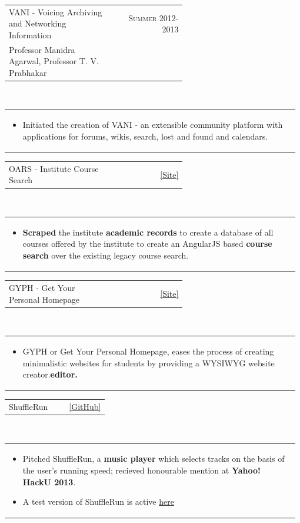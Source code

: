 \documentclass[a4paper]{article} %
\newcommand{\verticalspacing}{-0.25cm}
\newcommand{\headspace}{-0.3cm}
\newcommand{\bulletspace}{0.7cm}
\newcommand{\projectheadspacing}{6.9cm}
\newcommand{\cproject}[5]{%
    \begin{tabular}{p{0.60\linewidth}r}
        \textcolor{NavyBlue}{\small #2} & \multicolumn{1}{m{ \projectheadspacing{} }}{\raggedleft \small {\textsc{#1}}}\\
        \small {#3} & \small {#4}
    \end{tabular}\\
    \begin{tabular}{p{0.98\linewidth}}
    \vspace{-0.3cm}
        \small{#5}
    \end{tabular}
    \vspace{\verticalspacing{}}
}
\newcommand{\gitproject}[3]{%
    \begin{tabular}{p{0.60\linewidth}r}
        \textcolor{NavyBlue}{\small #2} & \multicolumn{1}{m{ \projectheadspacing{} }}{\raggedleft #1}\\
    \end{tabular}\\
    \begin{tabular}{p{0.98\linewidth}}
        \vspace{\headspace{}}
        \small{#3}
    \end{tabular}
    \vspace{\verticalspacing{}}
    \vspace{-0.2cm} %
}
\begin{document}
\cproject
    {Summer 2012-2013}
    {VANI - Voicing Archiving and Networking Information}
    {Professor Manidra Agarwal, Professor T. V. Prabhakar}
    {}
    {%
        \begin{itemize}[leftmargin=\bulletspace{}]
            \item Initiated the creation of VANI - an extensible community platform with applications
                for forums, wikis, search, lost and found and calendars.
        \end{itemize}
    }

\gitproject
    {\href{https://navya.github.io/oars} {\small{[Site]}}}
    {OARS - Institute Course Search}
    {%
        \begin{itemize}[leftmargin=\bulletspace{}]
            \item \textbf{Scraped} the institute \textbf{academic records} to create a database of all courses offered by the
                institute to create an AngularJS based \textbf{course search} over the existing legacy course search.
        \end{itemize}
    }

\gitproject
    {\href{http://gyph2.herokuapp.com/template1} {\small{[Site]}}}
    {GYPH - Get Your Personal Homepage}
    {%
        \begin{itemize}[leftmargin=\bulletspace{}]
            \item GYPH or Get Your Personal Homepage, eases the process of creating minimalistic websites for students
            by providing a WYSIWYG website creator.\textbf{editor.}
        \end{itemize}
    }

\gitproject
    {\href{https://srijanshetty.in/shufflerun} {\small{[GitHub]}}}
    {ShuffleRun}
    {%
        \begin{itemize}[leftmargin=\bulletspace{}]
            \item Pitched ShuffleRun, a \textbf{music player} which selects tracks on the basis of the user's
                running speed; recieved honourable mention at \textbf{Yahoo! HackU 2013}.
            \item A test version of ShuffleRun is active \href{https://srijanshetty.in/shufflerun} {here}
        \end{itemize}
    }

\end{document}
